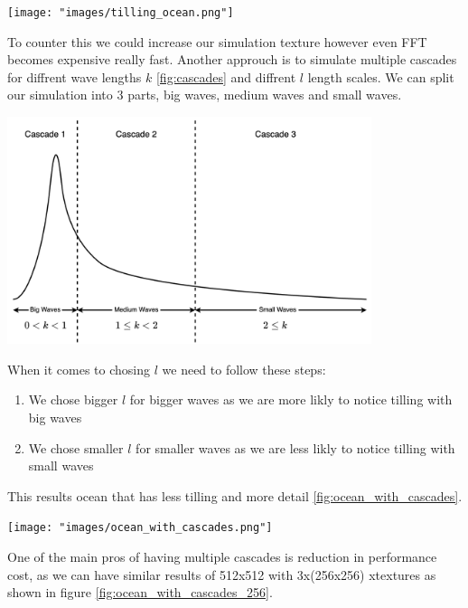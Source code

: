 \begin{minipage}{1\textwidth}
    \centering
    \texttt{[image: "images/tilling\_ocean.png"]}
    \label{fig:ocean_with_tilling}
\end{minipage}

To counter this we could increase our simulation texture however even FFT becomes expensive really fast.
Another approuch is to simulate multiple cascades for diffrent wave lengths $k$ \ref{fig:cascades} and diffrent $l$ length scales. We can split our simulation into 3 parts, big waves, medium waves and small waves.

\begin{minipage}{1\textwidth}
    \centering
    \includegraphics[width=0.8\textwidth]{"images/cascades.png"}
    \label{fig:cascades}
\end{minipage}
When it comes to chosing $l$ we need to follow these steps:
\begin{enumerate}
    \item We chose bigger $l$ for bigger waves as we are more likly to notice tilling with big waves
    \item We chose smaller $l$ for smaller waves as we are less likly to notice tilling with small waves
\end{enumerate}
This results ocean that has less tilling and more detail \ref{fig:ocean_with_cascades}.
\begin{minipage}{1\textwidth}
    \centering
    \texttt{[image: "images/ocean\_with\_cascades.png"]}
    \label{fig:ocean_with_cascades}
\end{minipage}

One of the main pros of having multiple cascades is reduction in performance cost, as we can have similar results of 512x512 with 3x(256x256) xtextures as shown in figure \ref{fig:ocean_with_cascades_256}.

